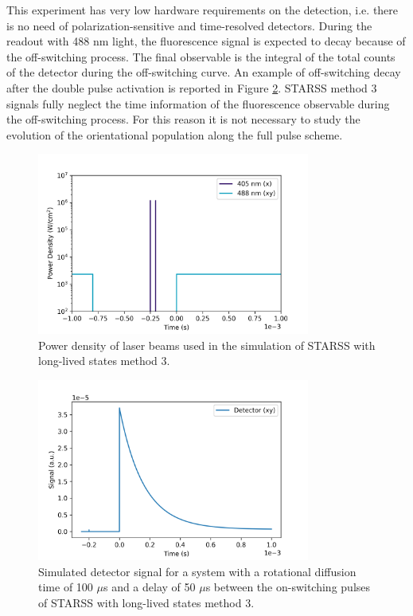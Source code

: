 \documentclass{article}
\begin{document}
This experiment has very low hardware requirements on the detection, i.e. there is no need of polarization-sensitive and time-resolved detectors. During the readout with 488 nm light, the fluorescence signal is expected to decay because of the off-switching process. The final observable is the integral of the total counts of the detector during the off-switching curve. An example of off-switching decay after the double pulse activation is reported in Figure \ref{fig:starss3_signal}. STARSS method 3 signals fully neglect the time information of the fluorescence observable during the off-switching process. For this reason it is not necessary to study the evolution of the orientational population along the full pulse scheme.

\begin{figure}[h!]
    \centering
    \includegraphics[width=0.8\textwidth]
    {figures/starss3_pulse_scheme.png}
    \caption[Power density used in the simulation of STARSS method 3]
    {Power density of laser beams used in the simulation of STARSS with long-lived states method 3.}
    \label{fig:starss3_pulse_scheme}
\end{figure}

\begin{figure}[h!]
    \centering
    \includegraphics[width=0.8\textwidth]
    {figures/starss3_signal.png}
    \caption[Simulated detector signals of STARSS method 3]
    {Simulated detector signal for a system with a rotational diffusion time of 100 $\mu$s and a delay of 50 $\mu$s between the on-switching pulses of STARSS with long-lived states method 3.}
    \label{fig:starss3_signal}
\end{figure}
\end{document}
